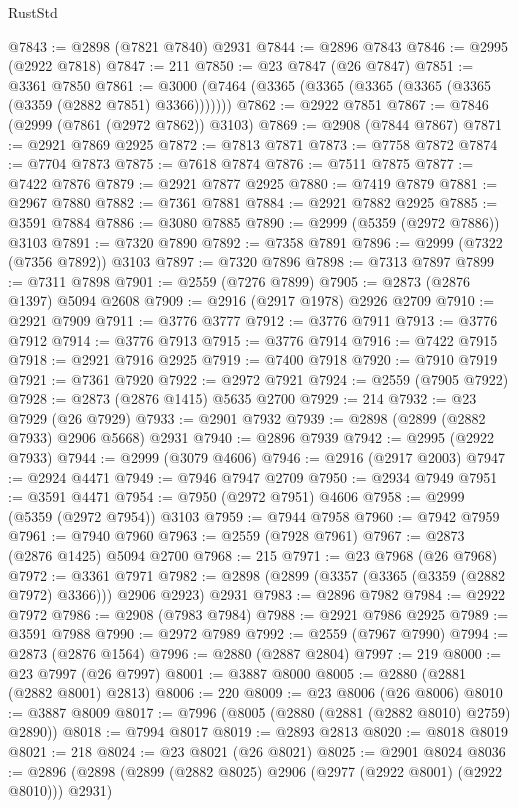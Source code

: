 \begin{lexlean}{RustStd}
\begin{coremodule}
@7843 := @2898 (@7821 @7840) @2931
@7844 := @2896 @7843
@7846 := @2995 (@2922 @7818)
@7847 := 211
@7850 := @23 @7847 (@26 @7847)
@7851 := @3361 @7850
@7861 := @3000 (@7464 (@3365 (@3365 (@3365 (@3365 (@3365 (@3359 (@2882 @7851) @3366)))))))
@7862 := @2922 @7851
@7867 := @7846 (@2999 (@7861 (@2972 @7862)) @3103)
@7869 := @2908 (@7844 @7867)
@7871 := @2921 @7869 @2925
@7872 := @7813 @7871
@7873 := @7758 @7872
@7874 := @7704 @7873
@7875 := @7618 @7874
@7876 := @7511 @7875
@7877 := @7422 @7876
@7879 := @2921 @7877 @2925
@7880 := @7419 @7879
@7881 := @2967 @7880
@7882 := @7361 @7881
@7884 := @2921 @7882 @2925
@7885 := @3591 @7884
@7886 := @3080 @7885
@7890 := @2999 (@5359 (@2972 @7886)) @3103
@7891 := @7320 @7890
@7892 := @7358 @7891
@7896 := @2999 (@7322 (@7356 @7892)) @3103
@7897 := @7320 @7896
@7898 := @7313 @7897
@7899 := @7311 @7898
@7901 := @2559 (@7276 @7899)
@7905 := @2873 (@2876 @1397) @5094 @2608
@7909 := @2916 (@2917 @1978) @2926 @2709
@7910 := @2921 @7909
@7911 := @3776 @3777
@7912 := @3776 @7911
@7913 := @3776 @7912
@7914 := @3776 @7913
@7915 := @3776 @7914
@7916 := @7422 @7915
@7918 := @2921 @7916 @2925
@7919 := @7400 @7918
@7920 := @7910 @7919
@7921 := @7361 @7920
@7922 := @2972 @7921
@7924 := @2559 (@7905 @7922)
@7928 := @2873 (@2876 @1415) @5635 @2700
@7929 := 214
@7932 := @23 @7929 (@26 @7929)
@7933 := @2901 @7932
@7939 := @2898 (@2899 (@2882 @7933) @2906 @5668) @2931
@7940 := @2896 @7939
@7942 := @2995 (@2922 @7933)
@7944 := @2999 (@3079 @4606)
@7946 := @2916 (@2917 @2003)
@7947 := @2924 @4471
@7949 := @7946 @7947 @2709
@7950 := @2934 @7949
@7951 := @3591 @4471
@7954 := @7950 (@2972 @7951) @4606
@7958 := @2999 (@5359 (@2972 @7954)) @3103
@7959 := @7944 @7958
@7960 := @7942 @7959
@7961 := @7940 @7960
@7963 := @2559 (@7928 @7961)
@7967 := @2873 (@2876 @1425) @5094 @2700
@7968 := 215
@7971 := @23 @7968 (@26 @7968)
@7972 := @3361 @7971
@7982 := @2898 (@2899 (@3357 (@3365 (@3359 (@2882 @7972) @3366))) @2906 @2923) @2931
@7983 := @2896 @7982
@7984 := @2922 @7972
@7986 := @2908 (@7983 @7984)
@7988 := @2921 @7986 @2925
@7989 := @3591 @7988
@7990 := @2972 @7989
@7992 := @2559 (@7967 @7990)
@7994 := @2873 (@2876 @1564)
@7996 := @2880 (@2887 @2804)
@7997 := 219
@8000 := @23 @7997 (@26 @7997)
@8001 := @3887 @8000
@8005 := @2880 (@2881 (@2882 @8001) @2813)
@8006 := 220
@8009 := @23 @8006 (@26 @8006)
@8010 := @3887 @8009
@8017 := @7996 (@8005 (@2880 (@2881 (@2882 @8010) @2759) @2890))
@8018 := @7994 @8017
@8019 := @2893 @2813
@8020 := @8018 @8019
@8021 := 218
@8024 := @23 @8021 (@26 @8021)
@8025 := @2901 @8024
@8036 := @2896 (@2898 (@2899 (@2882 @8025) @2906 (@2977 (@2922 @8001) (@2922 @8010))) @2931)

\end{coremodule}
\end{lexlean}
